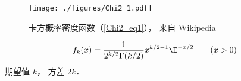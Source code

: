 
\begin{issues}
\issueDraft
\end{issues}

\begin{figure}[ht]
\centering
\texttt{[image: ./figures/Chi2\_1.pdf]}
\caption{卡方概率密度函数（\autoref{Chi2_eq1}）， 来自 Wikipedia} \label{Chi2_fig1}
\end{figure}

\begin{equation}\label{Chi2_eq1}
f_k(x) = \frac{1}{2^{k/2}\Gamma(k/2)}x^{k/2-1}\E^{-x/2} \qquad (x > 0)
\end{equation}
期望值 $k$， 方差 $2k$．
